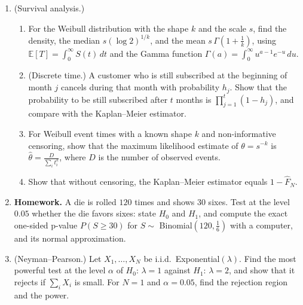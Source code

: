 \documentclass[11pt]{article}
\newcommand{\homework}{\textcolor{red!70!black}{\textbf{Homework.}}}
\newcommand{\E}{\mathbb{E}}
\theoremstyle{definition}
\theoremstyle{plain}
\theoremstyle{remark}
\begin{document}
\begin{enumerate}[leftmargin=*]
    \begin{enumerate}[label=(\alph*)]
        \item Show that a kernel density estimate $\hat f_h$ is a probability density.
        \item For the uniform kernel $K = \frac{1}{2}\mathbf{1}_{[-1, 1]}$, show that $\hat f_h(x) = \frac{1}{2Nh}\#\{i : |x - X_i| \leq h\}$, a histogram with a moving bin centered at $x$.
        \item For $\mathcal{N}(0, 1)$ data and the Gaussian kernel, show that $\E[\hat f_h(x)]$ is the density of $\mathcal{N}(0, 1 + h^2)$ at $x$. (Hint: it is the density of $X + hU$ with independent $X, U \sim \mathcal{N}(0, 1)$.) Compare $\E[\hat f_h(0)] - \varphi(0)$ with the bias $\frac{h^2}{2}\kappa_2f''(0)$ of Proposition~\ref{prop:kde} for small $h$.
    \end{enumerate}
    \item (Survival analysis.)
    \begin{enumerate}[label=(\alph*)]
        \item For the Weibull distribution with the shape $k$ and the scale $s$, find the density, the median $s(\log 2)^{1/k}$, and the mean $s\,\Gamma(1 + \frac{1}{k})$, using $\E[T] = \int_0^\infty S(t)\, dt$ and the Gamma function $\Gamma(a) = \int_0^\infty u^{a-1}e^{-u}\, du$.
        \item (Discrete time.) A customer who is still subscribed at the beginning of month $j$ cancels during that month with probability $h_j$. Show that the probability to be still subscribed after $t$ months is $\prod_{j=1}^t (1 - h_j)$, and compare with the Kaplan--Meier estimator.
        \item For Weibull event times with a known shape $k$ and non-informative censoring, show that the maximum likelihood estimate of $\theta = s^{-k}$ is $\hat\theta = \frac{D}{\sum_i t_i^k}$, where $D$ is the number of observed events.
        \item Show that without censoring, the Kaplan--Meier estimator equals $1 - \hat F_N$.
    \end{enumerate}
    \item \homework{} A die is rolled $120$ times and shows $30$ sixes. Test at the level $0.05$ whether the die favors sixes: state $H_0$ and $H_1$, and compute the exact one-sided p-value $P(S \geq 30)$ for $S \sim$ Binomial$(120, \frac{1}{6})$ with a computer, and its normal approximation.
    \item (Neyman--Pearson.) Let $X_1, \ldots, X_N$ be i.i.d.\ Exponential$(\lambda)$. Find the most powerful test at the level $\alpha$ of $H_0$: $\lambda = 1$ against $H_1$: $\lambda = 2$, and show that it rejects if $\sum_i X_i$ is small. For $N = 1$ and $\alpha = 0.05$, find the rejection region and the power.

\end{enumerate}
\end{document}
